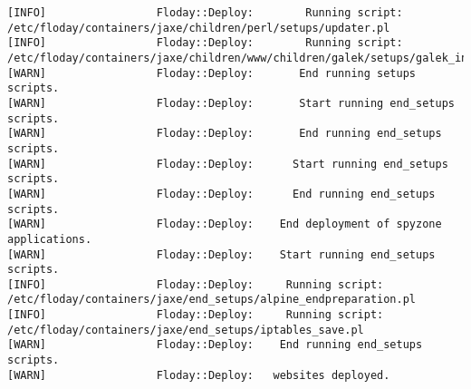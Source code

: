 \begin{lstlisting}[caption={config.yml}, label=fig_1.4_floday, basicstyle=\tiny, xleftmargin=-3cm]
[INFO]                 Floday::Deploy:        Running script: /etc/floday/containers/jaxe/children/perl/setups/updater.pl
[INFO]                 Floday::Deploy:        Running script: /etc/floday/containers/jaxe/children/www/children/galek/setups/galek_install.pl
[WARN]                 Floday::Deploy:       End running setups scripts.
[WARN]                 Floday::Deploy:       Start running end_setups scripts.
[WARN]                 Floday::Deploy:       End running end_setups scripts.
[WARN]                 Floday::Deploy:      Start running end_setups scripts.
[WARN]                 Floday::Deploy:      End running end_setups scripts.
[WARN]                 Floday::Deploy:    End deployment of spyzone applications.
[WARN]                 Floday::Deploy:    Start running end_setups scripts.
[INFO]                 Floday::Deploy:     Running script: /etc/floday/containers/jaxe/end_setups/alpine_endpreparation.pl
[INFO]                 Floday::Deploy:     Running script: /etc/floday/containers/jaxe/end_setups/iptables_save.pl
[WARN]                 Floday::Deploy:    End running end_setups scripts.
[WARN]                 Floday::Deploy:   websites deployed.
\end{lstlisting}
